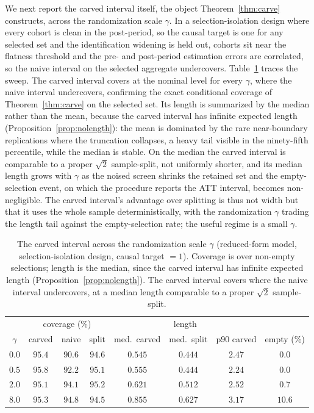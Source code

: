 \documentclass[12pt]{article}
\theoremstyle{remark}
\begin{document}
We next report the carved interval itself, the object Theorem~\ref{thm:carve} constructs, across the
randomization scale $\gamma$. In a selection-isolation design where every cohort is clean in the
post-period, so the causal target is one for any selected set and the identification widening is held out,
cohorts sit near the flatness threshold and the pre- and post-period estimation errors are correlated, so
the naive interval on the selected aggregate undercovers. Table~\ref{tab:carve} traces the sweep. The
carved interval covers at the nominal level for every $\gamma$, where the naive interval undercovers,
confirming the exact conditional coverage of Theorem~\ref{thm:carve} on the selected set. Its length is
summarized by the median rather than the mean, because the carved interval has infinite expected length
(Proposition~\ref{prop:nolength}): the mean is dominated by the rare near-boundary replications where the
truncation collapses, a heavy tail visible in the ninety-fifth percentile, while the median is stable.
On the median the carved interval is comparable to a proper $\sqrt2$ sample-split, not uniformly shorter,
and its median length grows with $\gamma$ as the noised screen shrinks the retained set and the
empty-selection event, on which the procedure reports the ATT interval, becomes non-negligible. The carved
interval's advantage over splitting is thus not width but that it uses the whole sample deterministically,
with the randomization $\gamma$ trading the length tail against the empty-selection rate; the useful
regime is a small $\gamma$.

\begin{table}[t]
\centering
\caption{The carved interval across the randomization scale $\gamma$ (reduced-form model,
selection-isolation design, causal target $=1$). Coverage is over non-empty selections; length is the
median, since the carved interval has infinite expected length (Proposition~\ref{prop:nolength}). The
carved interval covers where the naive interval undercovers, at a median length comparable to a proper
$\sqrt2$ sample-split.}
\begin{tabular}{cccccccc}
\hline
 & \multicolumn{3}{c}{coverage (\%)} & \multicolumn{3}{c}{length} & \\
$\gamma$ & carved & naive & split & med.\ carved & med.\ split & p90 carved & empty (\%) \\
\hline
$0.0$ & $95.4$ & $90.6$ & $94.6$ & $0.545$ & $0.444$ & $2.47$ & $0.0$ \\
$0.5$ & $95.8$ & $92.2$ & $95.1$ & $0.555$ & $0.444$ & $2.24$ & $0.0$ \\
$2.0$ & $95.1$ & $94.1$ & $95.2$ & $0.621$ & $0.512$ & $2.52$ & $0.7$ \\
$8.0$ & $95.3$ & $94.8$ & $94.5$ & $0.855$ & $0.627$ & $3.17$ & $10.6$ \\
\hline
\end{tabular}
\label{tab:carve}
\end{table}
\end{document}
